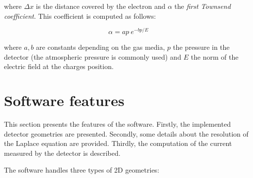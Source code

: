 \documentclass[11pt]{article}
\begin{document}
	where $\Delta x$ is the distance covered by the electron and $\alpha$ the
	\textit{first Townsend coefficient}. This coefficient is computed as follows:

	\[\alpha = ap \ e^{-bp/E}\]

	where $a, b$ are constants depending on the gas media, $p$ the pressure in
	the detector (the atmospheric pressure is commonly used) and $E$ the norm
	of the electric field at the charges position.

\section{Software features}
\label{sec:features}

	This section presents the features of the software. Firstly,
	the implemented detector geometries are presented. Secondly, some details
	about the resolution of the Laplace equation are provided. Thirdly, the
	computation of the current measured by the detector is described.

	The software handles three types of 2D geometries:
\end{document}
